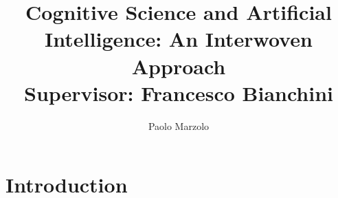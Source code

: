 \documentclass{article}
\title{Cognitive Science and Artificial Intelligence: An Interwoven Approach \\
\large Supervisor: Francesco Bianchini}
\author{Paolo Marzolo}
\begin{document}
\maketitle
\newpage

\section{Introduction}


\end{document}
